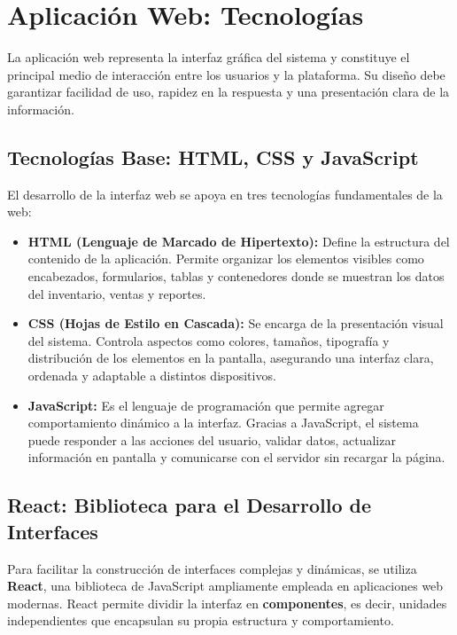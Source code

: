 \section{Aplicación Web: Tecnologías}

La aplicación web representa la interfaz gráfica del sistema y constituye el principal medio de interacción entre los usuarios y la plataforma. Su diseño debe garantizar facilidad de uso, rapidez en la respuesta y una presentación clara de la información. 

\subsection{Tecnologías Base: HTML, CSS y JavaScript}

El desarrollo de la interfaz web se apoya en tres tecnologías fundamentales de la web:

\begin{itemize}
\item \textbf{HTML (Lenguaje de Marcado de Hipertexto):}
Define la estructura del contenido de la aplicación. Permite organizar los elementos visibles como encabezados, formularios, tablas y contenedores donde se muestran los datos del inventario, ventas y reportes.

\item \textbf{CSS (Hojas de Estilo en Cascada):}  
Se encarga de la presentación visual del sistema. Controla aspectos como colores, tamaños, tipografía y distribución de los elementos en la pantalla, asegurando una interfaz clara, ordenada y adaptable a distintos dispositivos.

\item \textbf{JavaScript:}  
Es el lenguaje de programación que permite agregar comportamiento dinámico a la interfaz. Gracias a JavaScript, el sistema puede responder a las acciones del usuario, validar datos, actualizar información en pantalla y comunicarse con el servidor sin recargar la página.

\end{itemize}

\subsection{React: Biblioteca para el Desarrollo de Interfaces}

Para facilitar la construcción de interfaces complejas y dinámicas, se utiliza \textbf{React}, una biblioteca de JavaScript ampliamente empleada en aplicaciones web modernas. React permite dividir la interfaz en \textbf{componentes}, es decir, unidades independientes que encapsulan su propia estructura y comportamiento.

